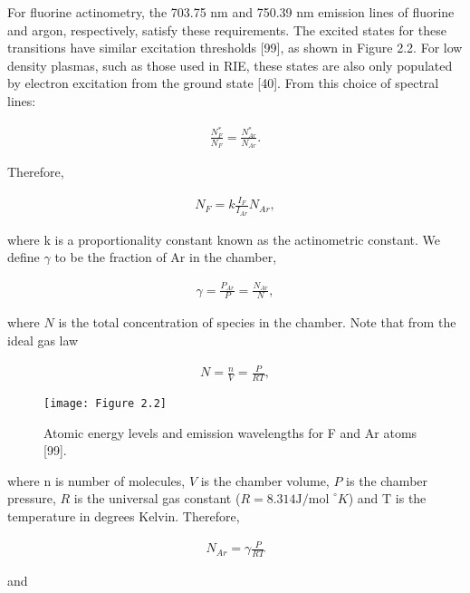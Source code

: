 For fluorine actinometry, the 703.75 nm and 750.39 nm emission lines of fluorine and
argon, respectively, satisfy these requirements. The excited states for these transitions have
similar excitation thresholds [99], as shown in Figure 2.2. For low density plasmas, such
as those used in RIE, these states are also only populated by electron excitation from the
ground state [40]. From this choice of spectral lines:


\begin{align}
	\frac{N_{F}^{*}}{N_{F}} = \frac{N_{Ar}^{*}}{N_{Ar}}.
\end{align}

\noindent Therefore, 

\begin{align}
	N_{F} = k\frac{I_{F}}{I_{Ar}}N_{Ar},
\end{align}


\noindent where k is a proportionality constant known as the actinometric constant. We define $\gamma$ to be the fraction of Ar in the chamber,

\begin{align}
	\gamma = \frac{P_{Ar}}{P} = \frac{N_{Ar}}{N},
\end{align}

\noindent where $N$ is the total concentration of species in the chamber. Note that from the ideal gas law



\begin{align}
	N = \frac{n}{V} = \frac{P}{RT},
\end{align}

\begin{figure}[H]
	\centering
	\texttt{[image: Figure 2.2]}
	\bf\caption{ Atomic energy levels and emission wavelengths for F and Ar atoms [99].}
	\label{fig:2.2}
\end{figure}

\noindent where n is number of molecules, $V$ is the chamber volume, $P$ is the chamber pressure, $R$ is the universal gas constant ($R = 8.314 \text{J/mol } ^{\circ} K$) and T is the temperature in degrees Kelvin. Therefore,

\begin{align}
	N_{Ar} = \gamma \frac{P}{RT}
\end{align}

\noindent and


